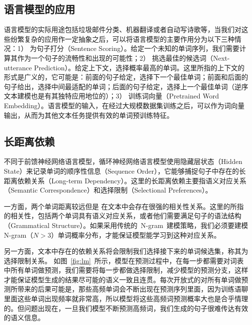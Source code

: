 \subsection{语言模型的应用}
语言模型的实际用途包括垃圾邮件分类、机器翻译或者自动写诗歌等，当我们对这些纷繁复杂的应用作一定抽象之后，可以将语言模型的主要作用分为以下三种情况：1） 为句子打分（Sentence Scoring）。给定一个未知的单词序列，我们需要计算其作为一个句子的流畅性和出现的可能性；2） 挑选最佳的候选词（Next-utterance Prediction）。给定上下文，选择概率最高的单词。这里所指的上下文的形式是广义的，它可能是：前面的句子给定，选择下一个最佳单词；前面和后面的句子给出，选择中间最适配的单词；后面的句子给定，选择上一个最佳单词（逆序文本建模也是有其独特应用地位的）；3） 训练词向量（Pretrained Word Embedding）。语言模型的输入，在经过大规模数据集训练之后，可以作为词向量输出，从而为其他文本任务提供有效的单词预训练特征。

\subsection{长距离依赖}
不同于前馈神经网络语言模型，循环神经网络语言模型使用隐藏层状态（Hidden State）来记录单词的顺序性信息（Sequence Order），它能够捕捉句子中存在的长距离依赖关系（Long-term Dependency）。这里的长距离依赖主要指语义对应关系（Semantic Correspondence）和选择限制（Selectional Preferences）。

一方面，两个单词距离较远但是 在文本中会存在很强的相关性关系。这里的所指的相关性，包括两个单词具有语义对应关系，或者他们需要满足句子的语法结构（Grammatical Structure）。如果采用传统的~N-gram~建模策略，我们必须要建模N-gram（$N>3$）单词概率分布，才能保证模型能学习到这种对应关系。

另一方面，文本中存在的依赖关系将会限制我们选择接下来的单词候选集，称其为选择限制关系。
如图~\ref{fig:lm}~所示，模型在预测过程中，在每一步都需要对词表中所有单词做预测，我们需要将每一步都做选择限制，减少模型的预测分支，这样才能保证模型生成的结果尽可能的语义一致且连贯。每次开放式的对所有单词做预测所带来的后果可能是，那些高频单词会不断出现在预测序列里面，因为训练语聊里面这些单词出现频率就非常高，所以模型将这些高频词预测概率大也是合乎情理的。但问题出现在，一旦我们模型不断预测高频词，我们生成的句子很难传达有效的语义信息。

